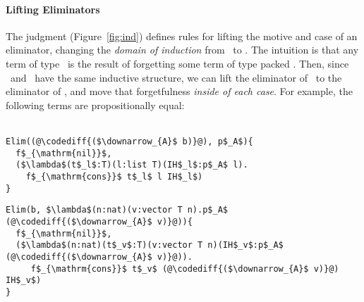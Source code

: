 \paragraph{Lifting Eliminators}

The  judgment (Figure~\ref{fig:ind}) defines rules for lifting the motive and case of an
eliminator, changing the \textit{domain of induction} from \Aa\ to \B.
The intuition is that any term of type \Aa\ is the result of forgetting some term of type packed \B.
Then, since \Aa\ and \B\ have the same inductive structure, we can lift the eliminator of \Aa\ to the eliminator of \B,
and move that forgetfulness \textit{inside of each case}.
For example,
the following terms are propositionally equal:\vspace{-0.2cm}\\\\
\begin{minipage}{0.39\textwidth}
\begin{lstlisting}
Elim((@\codediff{($\downarrow_{A}$ b)}@), p$_A$){
  f$_{\mathrm{nil}}$,
  ($\lambda$(t$_l$:T)(l:list T)(IH$_l$:p$_A$ l).
    f$_{\mathrm{cons}}$ t$_l$ l IH$_l$)
}
\end{lstlisting}
\end{minipage}
\hspace{-0.2cm}
\begin{minipage}{0.61\textwidth}
\begin{lstlisting}
Elim(b, $\lambda$(n:nat)(v:vector T n).p$_A$ (@\codediff{($\downarrow_{A}$ v)}@)){
  f$_{\mathrm{nil}}$,
  ($\lambda$(n:nat)(t$_v$:T)(v:vector T n)(IH$_v$:p$_A$ (@\codediff{($\downarrow_{A}$ v)}@)).
     f$_{\mathrm{cons}}$ t$_v$ (@\codediff{($\downarrow_{A}$ v)}@) IH$_v$)
}
\end{lstlisting}
\end{minipage}


